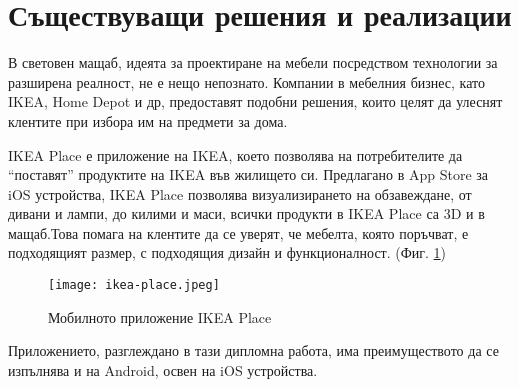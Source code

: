 \section{Съществуващи решения и реализации}
В световен мащаб, идеята за проектиране на мебели посредством технологии за разширена реалност, не е нещо непознато. Компании в мебелния бизнес, като IKEA, Home Depot и др, предоставят подобни решения, които целят да улеснят клентите при избора им на предмети за дома.

IKEA Place е приложение на IKEA, което позволява на потребителите да ``поставят'' продуктите на IKEA във жилището си. Предлагано в App Store за iOS устройства, IKEA Place позволява визуализирането на обзавеждане, от дивани и лампи, до килими и маси, всички продукти в IKEA Place са 3D и в мащаб.Това помага на клентите да се уверят, че мебелта, която поръчват, е подходящият размер, с подходящия дизайн и функционалност. (Фиг. \ref{fig:ikea-place})

\begin{figure}[H]
    \texttt{[image: ikea-place.jpeg]}
    \centering
    \caption{Мобилното приложение IKEA Place}
    \label{fig:ikea-place}
\end{figure}

Приложението, разглеждано в тази дипломна работа, има преимуществото да се изпълнява и на Android, освен на iOS устройства.